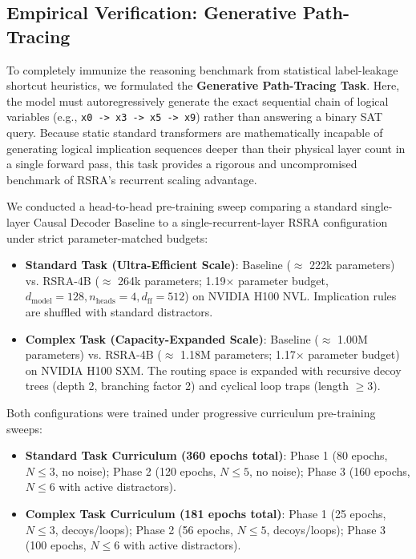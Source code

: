 \documentclass[11pt,a4paper]{article}
\theoremstyle{definition}
\begin{document}
\subsection{Empirical Verification: Generative Path-Tracing}

To completely immunize the reasoning benchmark from statistical label-leakage shortcut heuristics, we formulated the \textbf{Generative Path-Tracing Task}. Here, the model must autoregressively generate the exact sequential chain of logical variables (e.g., \texttt{x0 -> x3 -> x5 -> x9}) rather than answering a binary SAT query. Because static standard transformers are mathematically incapable of generating logical implication sequences deeper than their physical layer count in a single forward pass, this task provides a rigorous and uncompromised benchmark of RSRA's recurrent scaling advantage.

We conducted a head-to-head pre-training sweep comparing a standard single-layer Causal Decoder Baseline to a single-recurrent-layer RSRA configuration under strict parameter-matched budgets:
\begin{itemize}
    \item \textbf{Standard Task (Ultra-Efficient Scale)}: Baseline ($\approx$ 222k parameters) vs. RSRA-4B ($\approx$ 264k parameters; 1.19$\times$ parameter budget, $d_{\text{model}}=128, n_{\text{heads}}=4, d_{\text{ff}}=512$) on NVIDIA H100 NVL. Implication rules are shuffled with standard distractors.
    \item \textbf{Complex Task (Capacity-Expanded Scale)}: Baseline ($\approx$ 1.00M parameters) vs. RSRA-4B ($\approx$ 1.18M parameters; 1.17$\times$ parameter budget) on NVIDIA H100 SXM. The routing space is expanded with recursive decoy trees (depth 2, branching factor 2) and cyclical loop traps (length $\ge 3$).
\end{itemize}

Both configurations were trained under progressive curriculum pre-training sweeps:
\begin{itemize}
    \item \textbf{Standard Task Curriculum (360 epochs total)}: Phase 1 (80 epochs, $N \le 3$, no noise); Phase 2 (120 epochs, $N \le 5$, no noise); Phase 3 (160 epochs, $N \le 6$ with active distractors).
    \item \textbf{Complex Task Curriculum (181 epochs total)}: Phase 1 (25 epochs, $N \le 3$, decoys/loops); Phase 2 (56 epochs, $N \le 5$, decoys/loops); Phase 3 (100 epochs, $N \le 6$ with active distractors).
\end{itemize}
\end{document}

